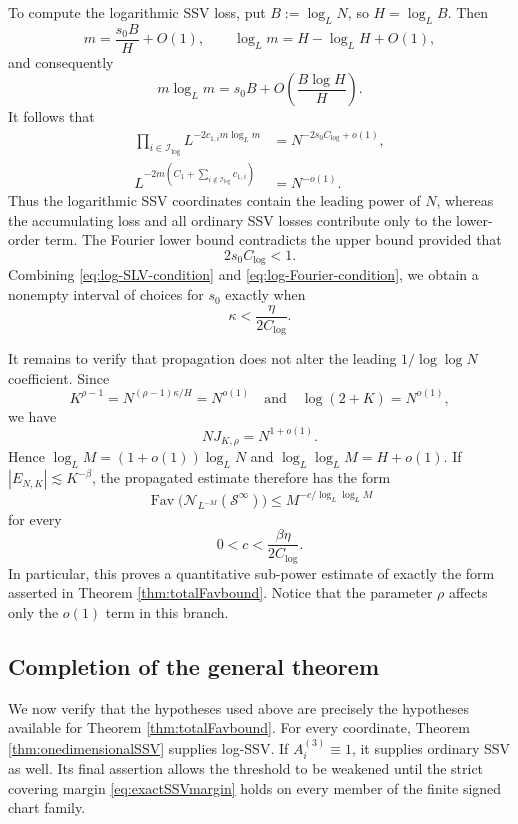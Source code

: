 \documentclass[12pt]{amsart}
\numberwithin{equation}{section}
\DeclareMathOperator{\Fav}{Fav}
\begin{document}
To compute the logarithmic SSV loss, put $B:=\log_LN$, so $H=\log_LB$.
Then
\[
 m=\frac{s_0B}{H}+O(1),
 \qquad
 \log_Lm=H-\log_LH+O(1),
\]
and consequently
\[
 m\log_Lm
 =s_0B+O\left(\frac{B\log H}{H}\right).
\]
It follows that
\begin{align}
 \prod_{i\in\mathcal I_{\log}}
 L^{-2c_{1,i}m\log_Lm}
 &=N^{-2s_0C_{\log}+o(1)},
 \label{eq:log-ssv-asymptotic}\\
 L^{-2m(C_1+\sum_{i\notin\mathcal I_{\log}}c_{1,i})}
 &=N^{-o(1)}.
 \label{eq:log-slv-asymptotic}
\end{align}
Thus the logarithmic SSV coordinates contain the leading power of $N$,
whereas the accumulating loss and all ordinary SSV losses contribute only to
the lower-order term.  The Fourier lower bound contradicts the upper bound
provided that
\begin{equation}\label{eq:log-Fourier-condition}
 2s_0C_{\log}<1.
\end{equation}
Combining \eqref{eq:log-SLV-condition} and
\eqref{eq:log-Fourier-condition}, we obtain a nonempty interval of choices for
$s_0$ exactly when
\begin{equation}\label{eq:optimizedlogcoefficient}
 \kappa<\frac{\eta}{2C_{\log}}.
\end{equation}

It remains to verify that propagation does not alter the leading
$1/\log\log N$ coefficient.  Since
\[
 K^{\rho-1}=N^{(\rho-1)\kappa/H}=N^{o(1)}
 \quad\text{and}\quad
 \log(2+K)=N^{o(1)},
\]
we have
\[
 NJ_{K,\rho}=N^{1+o(1)}.
\]
Hence $\log_LM=(1+o(1))\log_LN$ and
$\log_L\log_LM=H+o(1)$.  If
$|E_{N,K}|\lesssim K^{-\beta}$, the propagated estimate therefore has the
form
\[
 \Fav\bigl(\mathcal N_{L^{-M}}(\mathcal S^\infty)\bigr)
 \leq
 M^{-c/\log_L\log_LM}
\]
for every
\[
 0<c<\frac{\beta\eta}{2C_{\log}}.
\]
In particular, this proves a quantitative sub-power estimate of exactly the
form asserted in Theorem \ref{thm:totalFavbound}.  Notice that the parameter
$\rho$ affects only the $o(1)$ term in this branch.

\subsection{Completion of the general theorem}

We now verify that the hypotheses used above are precisely the hypotheses
available for Theorem \ref{thm:totalFavbound}.  For every coordinate,
Theorem \ref{thm:onedimensionalSSV} supplies log-SSV.  If
$A_i^{(3)}\equiv1$, it supplies ordinary SSV as well.  Its final assertion
allows the threshold to be weakened until the strict covering margin
\eqref{eq:exactSSVmargin} holds on every member of the finite signed chart
family.
\end{document}
